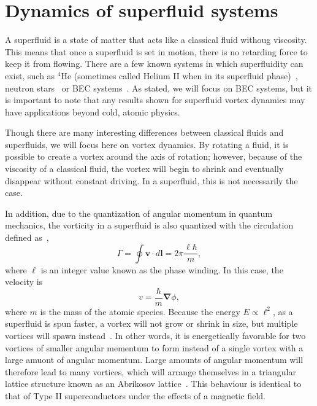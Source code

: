 \chapter{Dynamics of superfluid systems}
\label{ch:dynamics}

A superfluid is a state of matter that acts like a classical fluid withoug viscosity.
This means that once a superfluid is set in motion, there is no retarding force to keep it from flowing.
There are a few known systems in which superfluidity can exist, such as $^4$He (sometimes called Helium II when in its superfluid phase)~\cite{Allen1938}, neutron stars~\cite{Migdal1960} or BEC systems~\cite{Einstein1925, Anderson1995}.
As stated, we will focus on BEC systems, but it is important to note that any results shown for superfluid vortex dynamics may have applications beyond cold, atomic physics.

Though there are many interesting differences between classical fluids and superfluids, we will focus here on vortex dynamics.
By rotating a fluid, it is possible to create a vortex around the axis of rotation; however, because of the viscosity of a classical fluid, the vortex will begin to shrink and eventually disappear without constant driving.
In a superfluid, this is not necessarily the case.

In addition, due to the quantization of angular momentum in quantum mechanics, the vorticity in a superfluid is also quantized with the circulation defined as~\cite{Pethick2002},
\begin{equation}
\Gamma = \oint\mathbf{v} \cdot d \mathbf{l} = 2\pi \frac{\ell \hbar}{m},
\label{Eq:phase}
\end{equation}
where $\ell$ is an integer value known as the phase winding.
In this case, the velocity is
\begin{equation}
v = \frac{\hbar}{m}\mathbf{\nabla}\phi,
\end{equation}
where $m$ is the mass of the atomic species.
Because the energy $E \propto \ell^2$, as a superfluid is spun faster, a vortex will not grow or shrink in size, but multiple vortices will spawn instead~\cite{Pethick2002}.
In other words, it is energetically favorable for two vortices of smaller angular mementum to form instead of a single vortex with a large amuont of angular momentum.
Large amounts of angular momentum will therefore lead to many vortices, which will arrange themselves in a triangular lattice structure known as an Abrikosov lattice~\cite{Abrikosov1957, Fetter2001}.
This behaviour is identical to that of Type II superconductors under the effects of a magnetic field.

